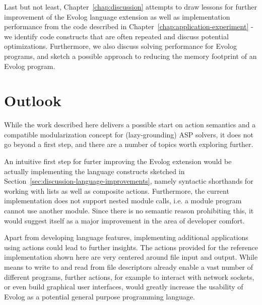 Last but not least, Chapter~\ref{chap:discussion} attempts to draw lessons for further improvement of the Evolog language extension as well as implementation performance from the code described in Chapter~\ref{chap:application-experiment} - we identify code constructs that are often repeated and discuss potential optimizations. Furthermore, we also discuss solving performance for Evolog programs, and sketch a possible approach to reducing the memory footprint of an Evolog program.

\section{Outlook}

While the work described here delivers a possible start on action semantics and a compatible modularization concept for (lazy-grounding) ASP solvers, it does not go beyond a first step, and there are a number of topics worth exploring further.

An intuitive first step for furter improving the Evolog extension would be actually implementing the language constructs sketched in Section~\ref{sec:discussion-language-improvements}, namely syntactic shorthands for working with lists as well as composite actions. Furthermore, the current implementation does not support nested module calls, i.e. a module program cannot use another module. Since there is no semantic reason prohibiting this, it would suggest itself as a major improvement in the area of developer comfort.

Apart from developing language features, implementing additional applications using actions could lead to further insights. The actions provided for the reference implementation shown here are very centered around file input and output. While means to write to and read from file descriptors already enable a vast number of different programs, further actions, for example to interact with network sockets, or even build graphical user interfaces, would greatly increase the usability of Evolog as a potential general purpose programming language.